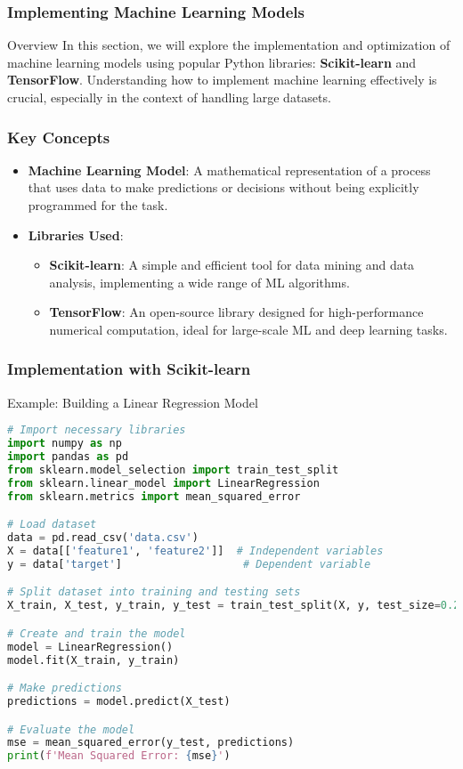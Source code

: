 \documentclass[aspectratio=169]{beamer}
\begin{document}
\begin{frame}
    \frametitle{Implementing Machine Learning Models}
    \begin{block}{Overview}
        In this section, we will explore the implementation and optimization of machine learning models using popular Python libraries: \textbf{Scikit-learn} and \textbf{TensorFlow}. Understanding how to implement machine learning effectively is crucial, especially in the context of handling large datasets.
    \end{block}
\end{frame}

\begin{frame}
    \frametitle{Key Concepts}
    \begin{itemize}
        \item \textbf{Machine Learning Model}: A mathematical representation of a process that uses data to make predictions or decisions without being explicitly programmed for the task.
        \item \textbf{Libraries Used}:
        \begin{itemize}
            \item \textbf{Scikit-learn}: A simple and efficient tool for data mining and data analysis, implementing a wide range of ML algorithms.
            \item \textbf{TensorFlow}: An open-source library designed for high-performance numerical computation, ideal for large-scale ML and deep learning tasks.
        \end{itemize}
    \end{itemize}
\end{frame}

\begin{frame}[fragile]
    \frametitle{Implementation with Scikit-learn}
    \begin{block}{Example: Building a Linear Regression Model}
    \begin{lstlisting}[language=Python]
# Import necessary libraries
import numpy as np
import pandas as pd
from sklearn.model_selection import train_test_split
from sklearn.linear_model import LinearRegression
from sklearn.metrics import mean_squared_error

# Load dataset
data = pd.read_csv('data.csv')
X = data[['feature1', 'feature2']]  # Independent variables
y = data['target']                   # Dependent variable

# Split dataset into training and testing sets
X_train, X_test, y_train, y_test = train_test_split(X, y, test_size=0.2, random_state=42)

# Create and train the model
model = LinearRegression()
model.fit(X_train, y_train)

# Make predictions
predictions = model.predict(X_test)

# Evaluate the model
mse = mean_squared_error(y_test, predictions)
print(f'Mean Squared Error: {mse}')
    \end{lstlisting}
    \end{block}
\end{frame}
\end{document}
